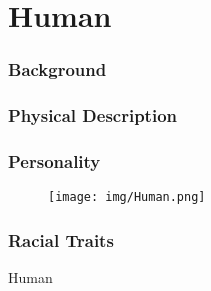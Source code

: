 \chapter*{Human}

\subsection*{Background}

\lipsum[1]

\subsection*{Physical Description}

\lipsum[1]

\subsection*{Personality}

\lipsum[1]

\begin{figure}[ht!]
	\texttt{[image: img/Human.png]}
\end{figure}

\subsection*{Racial Traits}
\begin{monsterbox}{Human}
	\vspace{.1in}
	\hline
	\stats[
	STR = +1,
	DEX = -1,
	VIT = -1,
	FOC = +1,
	WILL = +1
	]
	\hline
\end{monsterbox}